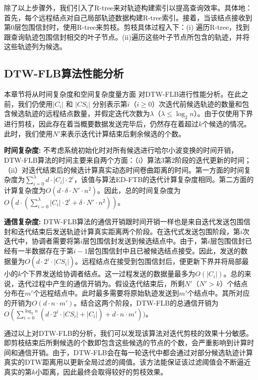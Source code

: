 除了以上步骤外，我们引入了R-tree来对轨迹构建索引以提高查询效率。具体地：首先，每个远程结点对自己局部轨迹数据构建R-tree索引。接着，当该结点接收到第$0$层包围信封时，使用R-tree来剪枝。剪枝具体过程入下：(i) 遍历R-tree，找到跟查询轨迹包围信封相交的叶子节点。(ii)遍历这些叶子节点所包含的轨迹，并将这些轨迹列为候选。


 \subsection{DTW-FLB算法性能分析}
 本章节将从时间复杂度和空间复杂度量方面 对DTW-FLB进行性能分析。在此之前，我们仍使用$|C_{i}|$ 和 $|CS_{i}|$ 分别表示第$i$（$i\ge 0$）次迭代前候选轨迹的数量和包含候选轨迹的远程结点数量，并假定迭代次数为$\lambda$（$\lambda \le \log_{2}n$）。由于仅使用下界进行剪枝，因此存在着当概要数据发送完毕后，仍然存在着超过$k$个候选的情况。此时，我们使用$N'$来表示迭代计算结束后剩余候选的个数。
 
 \textbf{时间复杂度:}
 不考虑系统初始化时对所有候选进行哈尔小波变换的时间开销，DTW-FLB算法的时间主要来自两个方面：（i）算法3第2阶段的迭代更新的时间；（ii）对迭代结束后的候选计算真实动态时间卷曲距离的时间。第一方面的时间复杂度为$ \sum_{i=0}^{\lambda}d\cdot |C_{i}| \cdot 2^{i} $，该值与算法ED-FTB的迭代计算复杂度相同。第二方面的计算复杂度为$O(d \cdot \delta \cdot  N' \cdot n^2)$。因此，总的时间复杂度为$O(d \cdot ( \sum_{i=0}^{\lambda}  |C_{i}| \cdot 2^{i}+\delta  \cdot N' \cdot n^2))$。
 
 \textbf{通信复杂度:}
DTW-FLB算法的通信开销跟时间开销一样也是来自迭代发送包围信封和迭代结束后发送轨迹计算真实距离两个阶段。在迭代式发送包围阶段，第$i$次迭代中，协调者需要将第$i$层包围信封发送到候选结点中。由于，第$i$层包围信封已经有一半数据存在于第$i-1$层包围信封中且已被候选结点接受。因此，发送的数据量为$O(d\cdot 2^{i} \cdot |CS_{i}|)$。远程结点在接受到包围信封后，便更新下界并将局部最小的$k$个下界发送给协调者结点。这一过程发送的数据量最多为$O(|C_{i}|)$。总的来说，迭代过程中产生的通信开销为。假设迭代结束后，所剩$N'$（$N'>k$）个结点分布在$m'$个远程结点中。此时最多需要将原始轨迹发送到$m'$个结点中。其所对应的开销为$O(d\cdot n\cdot m')$。结合这两个阶段，DTW-FLB的总通信开销为$O(\sum_{i=0}^{\log_{2}n}(d\cdot 2^{i} \cdot |CS_{i}| + |C_{i}|)+d\cdot n\cdot m'))$。

通过以上对DTW-FLB的分析，我们可以发现该算法对迭代剪枝的效果十分敏感。即剪枝结束后所剩候选的个数即包含这些候选的节点的个数，会严重影响到计算时间和通信开销。由于，DTW-FLB会在每一轮迭代中都会通过对部分候选轨迹计算真实的DTW距离用以更新全局过滤的阈值。该方法能保证该过滤阈值会不断逼近真实的第$k$小距离，因此最终会取得较好的剪枝效果。
 

